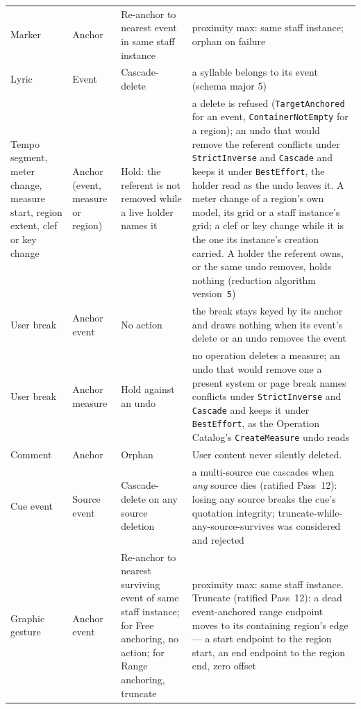 \documentclass[11pt,letterpaper]{report}
\begin{document}
\begin{longtable}{p{3.0cm} p{2.6cm} p{2.4cm} p{4.4cm}}
  Marker & Anchor &
  Re-anchor to nearest event in same staff instance &
  proximity max: same staff instance; orphan on failure \\

  Lyric & Event &
  Cascade-delete &
  a syllable belongs to its event (schema major 5) \\

  Tempo segment, meter change, measure start, region extent, clef or key
  change & Anchor (event, measure or region) &
  Hold: the referent is not removed while a live holder names it &
  a delete is refused (\texttt{TargetAnchored} for an event,
  \texttt{ContainerNotEmpty} for a region); an undo that would remove the
  referent conflicts under \texttt{StrictInverse} and \texttt{Cascade} and
  keeps it under \texttt{BestEffort}, the holder read as the undo leaves it.
  A meter change of a region's own model, its grid or a staff instance's
  grid; a clef or key change while it is the one its instance's creation
  carried. A holder the referent owns, or the same undo removes, holds
  nothing (reduction algorithm version~\texttt{5}) \\

  User break & Anchor event &
  No action &
  the break stays keyed by its anchor and draws nothing when its event's
  delete or an undo removes the event \\

  User break & Anchor measure &
  Hold against an undo &
  no operation deletes a measure; an undo that would remove one a present
  system or page break names conflicts under \texttt{StrictInverse} and
  \texttt{Cascade} and keeps it under \texttt{BestEffort}, as the
  Operation Catalog's \texttt{CreateMeasure} undo reads \\

  Comment & Anchor &
  Orphan &
  User content never silently deleted. \\

  Cue event & Source event &
  Cascade-delete on any source deletion &
  a multi-source cue cascades when \emph{any} source dies
  (ratified Pass~12): losing any source breaks the cue's
  quotation integrity; truncate-while-any-source-survives was
  considered and rejected \\

  Graphic gesture & Anchor event &
  Re-anchor to nearest surviving event of same staff instance;
  for Free anchoring, no action; for Range anchoring, truncate &
  proximity max: same staff instance. Truncate (ratified
  Pass~12): a dead event-anchored range endpoint moves to its
  containing region's edge --- a start endpoint to the region
  start, an end endpoint to the region end, zero offset \\


\end{longtable}
\end{document}

